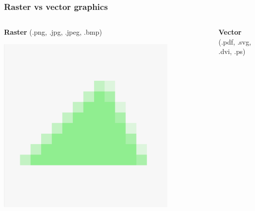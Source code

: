 \begin{frame}
    \frametitle{Raster vs vector graphics}

    \begin{columns}
        \begin{column}{0.5\textwidth}
            \centering
            \textbf{Raster} (.png, .jpg, .jpeg, .bmp)
            \medskip

            \includegraphics[width=0.8\textwidth]{assets/vector_vs_raster-vector-rasterized2_scaled.png}
        \end{column}
        \begin{column}{0.5\textwidth}
            \centering 
            \textbf{Vector} (.pdf, .svg, .dvi, .ps)
            \medskip

        \end{column}
    \end{columns}
\end{frame}

